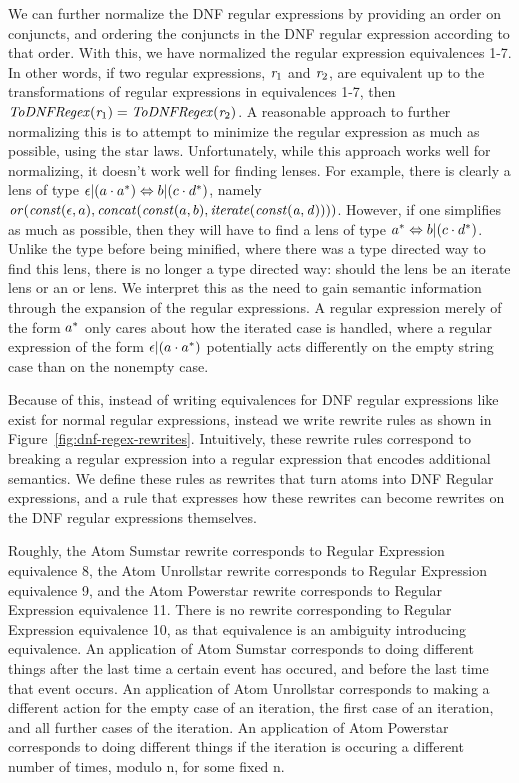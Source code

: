 We can further normalize the DNF regular expressions by providing an order on conjuncts,
and ordering the conjuncts in the DNF regular expression according to that order.
With this, we have normalized the regular expression equivalences 1-7.
In other words, if two regular expressions, $\mathit{r}_1$ and $\mathit{r}_2$,
are equivalent up to the transformations of regular expressions in equivalences 1-7,
then $\mathit{ToDNFRegex}(\mathit{r}_1)=\mathit{ToDNFRegex}(\mathit{r}_2)$.
A reasonable approach to further normalizing this is to attempt to minimize the
regular expression as much as possible, using the star laws.
Unfortunately, while this approach works well for normalizing, it doesn't work
well for finding lenses.  For example, there is clearly a lens of type
$\epsilon|(a\cdot a^*) \Leftrightarrow b|(c\cdot d^*)$,
namely $\mathit{or}(\mathit{const}(\epsilon,a),\mathit{concat}(\mathit{const}(a,b),\mathit{iterate(\mathit{const}(a,d))}))$.
However, if one simplifies as much as possible, then they will have to find a lens
of type $a^* \Leftrightarrow b|(c\cdot d^*)$.
Unlike the type before being minified, where there was a type directed way to find
this lens, there is no longer a type directed way: should the lens be an iterate lens
or an or lens.
We interpret this as the need to gain semantic information through the expansion of
the regular expressions.
A regular expression merely of the form $a^*$ only cares about how the iterated case is handled, where a regular expression of the form
$\epsilon|(a\cdot a^*)$ potentially acts differently on the empty
string case than on the nonempty case.


Because of this, instead of writing equivalences for DNF regular expressions like
exist for normal regular expressions,
instead we write rewrite rules as shown in Figure~\ref{fig:dnf-regex-rewrites}.
Intuitively, these rewrite rules correspond to breaking a regular expression
into a regular expression that encodes additional semantics.
We define these rules as rewrites that turn atoms into DNF Regular expressions,
and a rule that expresses how these rewrites can become rewrites on
the DNF regular expressions themselves.

Roughly, the Atom Sumstar rewrite corresponds to Regular Expression equivalence 8,
the Atom Unrollstar rewrite corresponds to Regular Expression equivalence 9,
and the Atom Powerstar rewrite corresponds to Regular Expression equivalence 11.
There is no rewrite corresponding to Regular Expression equivalence 10, as that
equivalence is an ambiguity introducing equivalence.
An application of Atom Sumstar corresponds to doing different things after the last time a certain event has occured, and before the last time that event occurs.
An application of Atom Unrollstar corresponds to making a different action for
the empty case of an iteration, the first case of an iteration, and all further cases of the iteration.
An application of Atom Powerstar corresponds to doing different things if the iteration
is occuring a different number of times, modulo n, for some fixed n.

